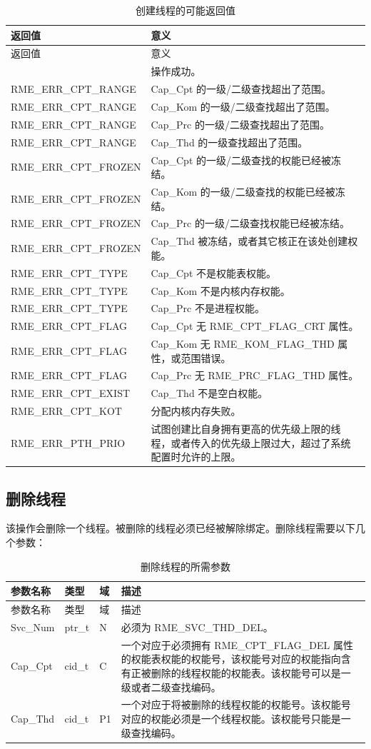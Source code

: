\begin{xltabular}{\textwidth}{@{}>{\hsize\raggedright\arraybackslash}X>{\hsize\raggedright\arraybackslash}X@{}}
\caption{创建线程的可能返回值}\label{tab:4-21-create-thread-return-values}\\
\toprule
返回值 & 意义\tabularnewline
\endfirsthead
\toprule
返回值 & 意义\tabularnewline
\midrule
\endhead
\bottomrule
{} & 操作成功。\tabularnewline
    RME\_ERR\_CPT\_RANGE & Cap\_Cpt 的一级/二级查找超出了范围。\tabularnewline
    RME\_ERR\_CPT\_RANGE & Cap\_Kom 的一级/二级查找超出了范围。\tabularnewline
    RME\_ERR\_CPT\_RANGE & Cap\_Prc 的一级/二级查找超出了范围。\tabularnewline
    RME\_ERR\_CPT\_RANGE & Cap\_Thd 的一级查找超出了范围。\tabularnewline
    RME\_ERR\_CPT\_FROZEN & Cap\_Cpt 的一级/二级查找的权能已经被冻结。\tabularnewline
    RME\_ERR\_CPT\_FROZEN & Cap\_Kom 的一级/二级查找的权能已经被冻结。\tabularnewline
    RME\_ERR\_CPT\_FROZEN & Cap\_Prc 的一级/二级查找权能已经被冻结。\tabularnewline
    RME\_ERR\_CPT\_FROZEN & Cap\_Thd 被冻结，或者其它核正在该处创建权能。\tabularnewline
    RME\_ERR\_CPT\_TYPE & Cap\_Cpt 不是权能表权能。\tabularnewline
    RME\_ERR\_CPT\_TYPE & Cap\_Kom 不是内核内存权能。\tabularnewline
    RME\_ERR\_CPT\_TYPE & Cap\_Prc 不是进程权能。\tabularnewline
    RME\_ERR\_CPT\_FLAG & Cap\_Cpt 无 RME\_CPT\_FLAG\_CRT 属性。\tabularnewline
    RME\_ERR\_CPT\_FLAG & Cap\_Kom 无 RME\_KOM\_FLAG\_THD 属性，或范围错误。\tabularnewline
    RME\_ERR\_CPT\_FLAG & Cap\_Prc 无 RME\_PRC\_FLAG\_THD 属性。\tabularnewline
    RME\_ERR\_CPT\_EXIST & Cap\_Thd 不是空白权能。\tabularnewline
    RME\_ERR\_CPT\_KOT & 分配内核内存失败。\tabularnewline
    RME\_ERR\_PTH\_PRIO & 试图创建比自身拥有更高的优先级上限的线程，或者传入的优先级上限过大，超过了系统配置时允许的上限。\tabularnewline
\bottomrule
\end{xltabular}

\subsection{删除线程}\label{subsec:4-delete-a-thread}
\nopagebreak[4]

该操作会删除一个线程。被删除的线程必须已经被解除绑定。删除线程需要以下几个参数：

\begin{xltabular}{\textwidth}{@{}>{\hsize\raggedright\arraybackslash}X>{\hsize\raggedright\arraybackslash}X>{\hsize\raggedright\arraybackslash}X>{\hsize\raggedright\arraybackslash}X@{}}
\caption{删除线程的所需参数}\label{tab:4-22-delete-thread-parameters}\\
\toprule
参数名称 & 类型 & 域 & 描述\tabularnewline
\endfirsthead
\toprule
参数名称 & 类型 & 域 & 描述\tabularnewline
\midrule
\endhead
Svc\_Num & ptr\_t & N & 必须为 RME\_SVC\_THD\_DEL。\tabularnewline
Cap\_Cpt & cid\_t & C &
一个对应于必须拥有 RME\_CPT\_FLAG\_DEL 属性的权能表权能的权能号，该权能号对应的权能指向含有正被删除的线程权能的权能表。该权能号可以是一级或者二级查找编码。\tabularnewline
Cap\_Thd & cid\_t & P1 &
一个对应于将被删除的线程权能的权能号。该权能号对应的权能必须是一个线程权能。该权能号只能是一级查找编码。\tabularnewline
\end{xltabular}

